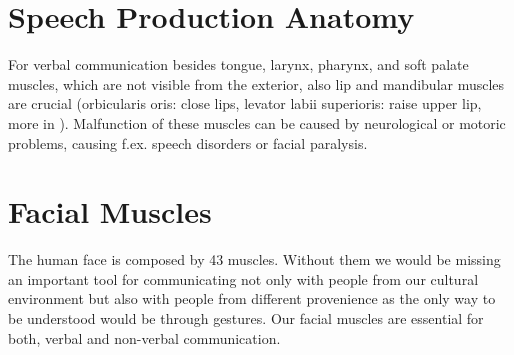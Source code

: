 \begin{comment}
\begin{figure}[htbp]
\centering
 \subbottom[Example of games that can be used for SLP therapy.Descriptive game from ]{%
    \texttt{[image: gameSLP]}}%
 \subbottom[Electrglottograph also called laryngograph]{%
    \hspace{0.5cm}\texttt{[image: egg]}}
 \subbottom[Airflow machine]{%
    \texttt{[image: airflow\_machine]}}%
    \subbottom[ultrasound]{%
    \hspace{0.5cm}\texttt{[image: ultrasoundhat]}} 
 \subbottom[Palatometer with electrodes]{%
    \texttt{[image: palatometer]}}    	
\subbottom[Smart palate]{%
    \hspace{0.5cm}\texttt{[image: smartpalate]}}%
 
\caption{Devices used by SLPs}
\label{fig:tools}
\end{figure}





\end{comment}



\section{Speech Production Anatomy}
For verbal communication besides tongue, larynx, pharynx, and soft palate muscles, which are not visible from the exterior, also lip and mandibular muscles are crucial (orbicularis oris: close lips, levator labii superioris: raise upper lip, more in \cite{PhonManual}). 
Malfunction of these muscles can be caused by neurological or motoric problems, causing f.ex. speech disorders or facial paralysis. 


\section{Facial Muscles}
\label{sec:anatomy}

The human face is composed by 43 muscles. Without them we would be missing an important tool for communicating not only with people from our cultural environment but also with people from different provenience as the only way to be understood would be through gestures. Our facial muscles are essential for both, verbal and non-verbal communication.\par 

